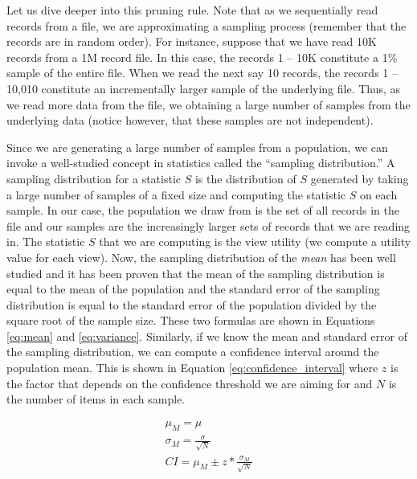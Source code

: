 Let us dive deeper into this pruning rule.
Note that as we sequentially read records from a file, we are
approximating a sampling process (remember that the records are in random order).
For instance, suppose that we have read 10K records from a 1M record file.
In this case, the records 1 -- 10K constitute a 1\% sample of the entire file.
When we read the next say 10 records, the records 1 -- 10,010 constitute an
incrementally larger sample of the underlying file.
Thus, as we read more data from the file, we obtaining a large
number of samples from the underlying data (notice however, that these samples
are not independent).

Since we are generating a large number of samples from a population, we can
invoke a well-studied concept in statistics called the ``sampling distribution.'' 
A sampling distribution for a statistic $S$ is the distribution of
$S$ generated by taking a large number of samples of a fixed size and computing
the statistic $S$ on each sample.
In our case, the population we draw from is the set of all records in the file
and our samples are the increasingly larger sets of records that we are reading in.
The statistic $S$ that we are computing is the view utility (we
compute a utility value for each view).
Now, the sampling distribution of the {\it mean} has been well studied and it
has been proven that the mean of the sampling distribution is equal to the mean of the
population and the standard error of the sampling distribution is equal to the
standard error of the population divided by the square root of the sample size. 
These two formulas are shown in Equations \ref{eq:mean} and \ref{eq:variance}.
Similarly, if we know the mean and standard error of the sampling distribution,
we can compute a confidence interval around the population mean. This is shown
in Equation \ref{eq:confidence_interval} where $z$ is the factor that depends on the
confidence threshold we are aiming for and $N$ is the number of items
in each sample.

\begin{eqnarray}
\label{eqnarray:mean_and_variance}
\mu_M = \mu \label{eq:mean}\\
\sigma_{M} = \frac{\sigma}{\sqrt{N}} \label{eq:variance}\\
CI = \mu_M \pm z \ast \frac{\sigma_M}{\sqrt{N}}\label{eq:confidence_interval}
\end{eqnarray}

